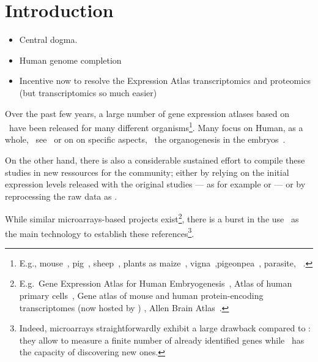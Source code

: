 \chapter*{Introduction}
\label{ch:intro}


\begin{itemize}
    \item Central dogma.
    \item Human genome completion
    \item Incentive now to resolve the Expression Atlas transcriptomics and proteomics (but transcriptomics so much easier)
\end{itemize}




Over the past few years, a large number of gene expression atlases based on
\Rnaseq\ have been released for many different organisms\footnote{E.g.,
mouse~, pig~,
sheep~, plants as maize~,
vigna~,pigeonpea~,
parasite, \eg\ .}.
Many focus on Human, as a whole,
\eg\ see~
or on on specific aspects,
\eg\ the organogenesis in the embryos~.

On the other hand, there is also a considerable sustained effort
to compile these studies in new ressources for the community;
either by relying on the initial expression levels released with the original
studies --- as for example
 or
--- or
by reprocessing the raw data as
.

While similar microarrays-based projects exist\footnote{E.g.\ Gene Expression
Atlas for Human Embryogenesis~, Atlas of human primary
cells~, Gene atlas of mouse and human protein-encoding
transcriptomes (now hosted by ) ,
Allen Brain Atlas~.},
there is a burst in the use \Rnaseq\ as the main technology to establish
these references\footnote{Indeed, microarrays straightforwardly exhibit
a large drawback compared to \Rnaseq:
they allow to measure a finite number of already identified genes
while \Rnaseq\ has the capacity of discovering new ones.}.



